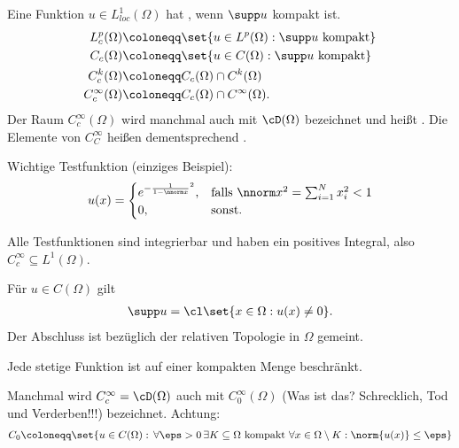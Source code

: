 Eine Funktion $u \in L^{1}_{loc}(\Omega)$ hat , wenn $\supp u$ kompakt ist.
\begin{align*}
  L_{c}^{p}(\Omega) & \coloneqq \set{ u \in L^{p}(\Omega): \supp u \text{ kompakt}}\\
  C_{c}(\Omega) & \coloneqq \set{ u \in C(\Omega): \supp u \text{ kompakt}}\\
  C_{c}^{k}(\Omega) & \coloneqq C_{c}(\Omega) \cap C^{k}(\Omega)\\
  C_{c}^{\infty}(\Omega) & \coloneqq C_{c}(\Omega) \cap C^{\infty}(\Omega). 
\end{align*}
Der Raum $C_{c}^{\infty}(\Omega)$ wird manchmal auch mit $\cD(\Omega)$ bezeichnet und heißt . Die Elemente von $C_{C}^{\infty}$ heißen dementsprechend . 
\begin{beispiel} Wichtige Testfunktion (einziges Beispiel):
  \begin{align*}
    u(x) =
    \begin{cases}
      e^{- \frac 1 {1- \nnorm x}^{2}}, & \text{falls } \nnorm x^{2} = \sum_{i = 1}^{N}x_{i}^{2} < 1\\
      0, & \text{sonst}. 
    \end{cases}
  \end{align*}
\end{beispiel}
Alle Testfunktionen sind integrierbar und haben ein positives Integral, also $C_{c}^{\infty} \subseteq L^{1}(\Omega)$. 
\begin{uebung}
  Für $u \in C(\Omega)$ gilt
  \begin{align*}
    \supp u = \cl \set{x \in \Omega: u(x) \neq 0}.
  \end{align*}
Der Abschluss ist bezüglich der relativen Topologie in $\Omega$ gemeint. 
\end{uebung}
Jede stetige Funktion ist auf einer kompakten Menge beschränkt. 
\begin{bemerkung}
  Manchmal wird $C_{c}^{\infty} = \cD(\Omega)$ auch mit $C_{0}^{\infty}(\Omega)$ (Was ist das? Schrecklich, Tod und Verderben!!!) bezeichnet. Achtung:
  \begin{align*}
    C_{0}\coloneqq \set{ u \in C(\Omega): \, \forall \eps > 0\, \exists K \subseteq \Omega \text{ kompakt }\forall x \in \Omega \setminus K: \norm{u(x)} \leq \eps}
  \end{align*}
\end{bemerkung}

